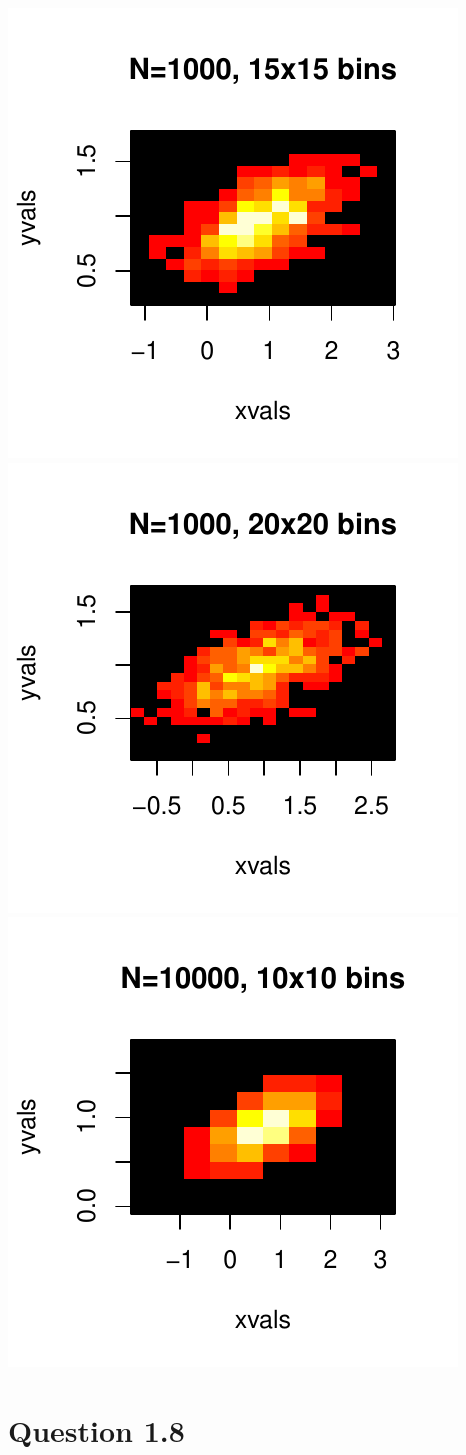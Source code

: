\documentclass[a4paper, oneside, final]{memoir}
\begin{document}
\includegraphics{img/question17-plot-1000-15x15.pdf}
\includegraphics{img/question17-plot-1000-20x20.pdf}
\includegraphics{img/question17-plot-10000.pdf}

\section*{Question 1.8}
\end{document}
